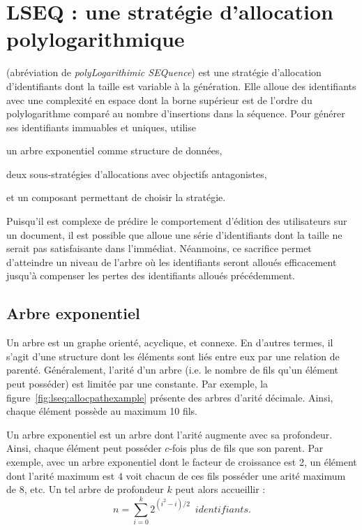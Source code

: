
\section{LSEQ : une stratégie d'allocation polylogarithmique}

\LSEQ (abréviation de \emph{polyLogarithimic SEQuence}) est une stratégie
d'allocation d'identifiants dont la taille est variable à la génération. Elle
alloue des identifiants avec une complexité en espace dont la borne supérieur
est de l'ordre du polylogarithme comparé au nombre d'insertions dans la
séquence.  Pour générer ses identifiants immuables et uniques, \LSEQ utilise
\begin{inparaenum}[(i)]
\item un arbre exponentiel comme structure de données,
\item deux sous-stratégies d'allocations avec objectifs antagonistes,
\item et un composant permettant de choisir la stratégie.
\end{inparaenum}

Puisqu'il est complexe de prédire le comportement d'édition des utilisateurs sur
un document, il est possible que \LSEQ alloue une série d'identifiants dont la
taille ne serait pas satisfaisante dans l'immédiat. Néanmoins, ce sacrifice
permet d'atteindre un niveau de l'arbre \LSEQ où les identifiants seront alloués 
efficacement jusqu'à compenser les pertes des identifiants alloués précédemment.

\subsection{Arbre exponentiel}

Un arbre est un graphe orienté, acyclique, et connexe. En d'autres termes, il
s'agit d'une structure dont les éléments sont liés entre eux par une relation de
parenté. Généralement, l'arité d'un arbre (i.e. le nombre de fils qu'un élément
peut posséder) est limitée par une constante. Par exemple, la
figure~\ref{fig:lseq:allocpathexample} présente des arbres d'arité
décimale. Ainsi, chaque élément possède au maximum 10 fils.

Un arbre exponentiel est un arbre dont l'arité augmente avec sa
profondeur. Ainsi, chaque élément peut posséder $c$-fois plus de fils que son
parent. Par exemple, avec un arbre exponentiel dont le facteur de croissance est
2, un élément dont l'arité maximum est $4$ voit chacun de ces fils posséder une
arité maximum de $8$, etc.  Un tel arbre de profondeur $k$ peut alors accueillir
:
\begin{equation}
  n = \sum\limits_{i=0}^{k} 2^{(i^2-i)/2}\,\,\, identifiants.
\end{equation}

